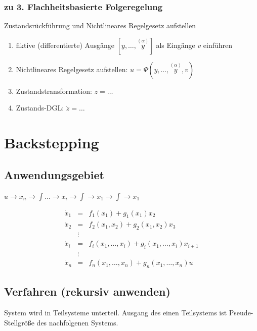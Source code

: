 \documentclass[german]{latex4ei/latex4ei_sheet}
\newcommand{\os}[2]{\ensuremath{\overset{#1}{#2}}}
\begin{document}
\subsubsection*{zu 3. Flachheitsbasierte Folgeregelung}
Zustandsrückführung und Nichtlineares Regelgesetz aufstellen
\begin{enumerate}
  \item fiktive (differentierte) Ausgänge $\left[ y, \dots, \os{(\alpha)}{y} \right]$ als Eingänge $v$ einführen
  \item Nichtlineares Regelgesetz aufstellen: $u = \Psi\left( y, \dots, \os{(\alpha)}{y}, v \right)$
  \item Zustandstransformation: $z = \dots$
  \item Zustands-DGL: $\dot{z} = \dots$
\end{enumerate}


\section{Backstepping}

\subsection{Anwendungsgebiet}
$u \rightarrow \dot{x}_n \rightarrow \int \dots \rightarrow \dot{x}_i \rightarrow \int \rightarrow \dot{x}_1 \rightarrow \int \rightarrow x_1$

\begin{align*}
  \dot{x}_1 &=      & f_1(x_1) + g_1(x_1)x_2 \\
  \dot{x}_2 &=      & f_2(x_1, x_2) + g_2(x_1, x_2)x_3 \\
            &\vdots & \\
  \dot{x}_i &=      & f_i(x_1, \dots, x_i) + g_i(x_1, \dots, x_i)x_{i+1} \\
            &\vdots & \\
  \dot{x}_n &=      & f_n(x_1, \dots, x_n) + g_n(x_1, \dots, x_n)u
\end{align*}


\subsection{Verfahren (rekursiv anwenden)}

System wird in Teilsysteme unterteil. Ausgang des einen Teilsystems ist Pseude-Stellgröße des nachfolgenen Systems.
\end{document}
